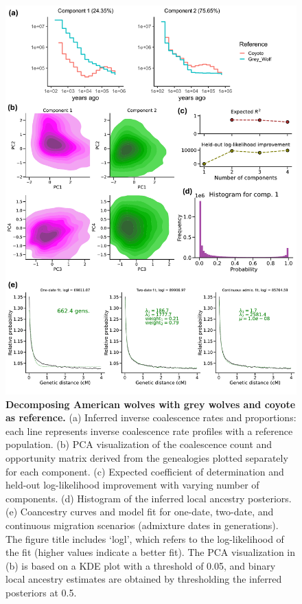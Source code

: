 \begin{figure}[h!]
    \centering
    \includegraphics[width=\linewidth]{figures/gb_sims/gb_real_wolves.pdf}
    \captionsetup{width=\textwidth+3cm}
    \caption{
    \footnotesize
    \textbf{Decomposing American wolves with grey wolves and coyote as reference.} (a) Inferred inverse coalescence rates and proportions: each line represents inverse coalescence rate profiles with a reference population. (b) PCA visualization of the coalescence count and opportunity matrix derived from the genealogies plotted separately for each component. (c) Expected coefficient of determination and held-out log-likelihood improvement with varying number of components. (d)  Histogram of the inferred local ancestry posteriors. (e) Coancestry curves and model fit for one-date, two-date, and continuous migration scenarios (admixture dates in generations). The figure title includes `logl', which refers to the log-likelihood of the fit (higher values indicate a better fit). The PCA visualization in (b) is based on a KDE plot with a threshold of 0.05, and binary local ancestry estimates are obtained by thresholding the inferred posteriors at 0.5.
    }
    \label{fig:gb_real_wolves}
\end{figure}